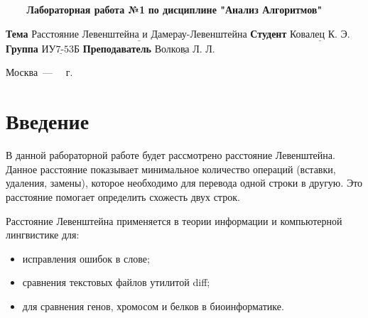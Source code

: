 \documentclass[a4paper,14pt, unknownkeysallowed]{extreport}
\begin{document}
\begin{titlepage}
	
	\begin{center}
		\noindent\begin{minipage}{1.3\textwidth}\centering
		\Large\textbf{   ~~~ Лабораторная работа №1}\newline
		\textbf{по дисциплине "Анализ Алгоритмов"}\newline\newline\newline
		\end{minipage}
	\end{center}
	
	\noindent\textbf{Тема} 			$\underline{\text{Расстояние Левенштейна и Дамерау-Левенштейна}}$\newline\newline
	\noindent\textbf{Студент} 		$\underline{\text{Ковалец К. Э.}}$\newline\newline
	\noindent\textbf{Группа} 		$\underline{\text{ИУ7-53Б}}$\newline\newline
	\noindent\textbf{Преподаватель} $\underline{\text{Волкова Л. Л.}}$\newline
	
	\begin{center}
		\vfill
		Москва~---~\the\year
		~г.
	\end{center}
	\restoregeometry
\end{titlepage}



\renewcommand{\contentsname}{Содержание} 
\tableofcontents
\setcounter{page}{2}





\chapter*{Введение}

В данной рабораторной работе будет рассмотрено расстояние Левенштейна. Данное расстояние показывает минимальное количество операций (вставки, удаления, замены), которое необходимо для перевода одной строки в другую. Это расстояние помогает определить схожесть двух строк.

Расстояние Левенштейна применяется в теории информации и компьютерной лингвистике для:

\begin{itemize}
	\item исправления ошибок в слове;
	\item сравнения текстовых файлов утилитой diff;
	\item для сравнения генов, хромосом и белков в биоинформатике.
\end{itemize}
\end{document}

